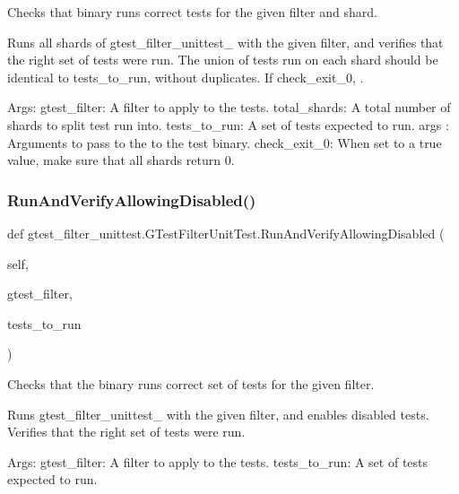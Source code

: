 \begin{DoxyVerb}Checks that binary runs correct tests for the given filter and shard.

Runs all shards of gtest_filter_unittest_ with the given filter, and
verifies that the right set of tests were run. The union of tests run
on each shard should be identical to tests_to_run, without duplicates.
If check_exit_0, .

Args:
  gtest_filter: A filter to apply to the tests.
  total_shards: A total number of shards to split test run into.
  tests_to_run: A set of tests expected to run.
  args   :      Arguments to pass to the to the test binary.
  check_exit_0: When set to a true value, make sure that all shards
            return 0.
\end{DoxyVerb}
 \mbox{\label{classgtest__filter__unittest_1_1GTestFilterUnitTest_ae52bd70ef1dcb68c83c0379ddfb987a9}} 
\subsubsection{\texorpdfstring{Run\+And\+Verify\+Allowing\+Disabled()}{RunAndVerifyAllowingDisabled()}}
{\footnotesize\ttfamily def gtest\+\_\+filter\+\_\+unittest.\+G\+Test\+Filter\+Unit\+Test.\+Run\+And\+Verify\+Allowing\+Disabled (\begin{DoxyParamCaption}\item[{}]{self,  }\item[{}]{gtest\+\_\+filter,  }\item[{}]{tests\+\_\+to\+\_\+run }\end{DoxyParamCaption})}

\begin{DoxyVerb}Checks that the binary runs correct set of tests for the given filter.

Runs gtest_filter_unittest_ with the given filter, and enables
disabled tests. Verifies that the right set of tests were run.

Args:
  gtest_filter: A filter to apply to the tests.
  tests_to_run: A set of tests expected to run.
\end{DoxyVerb}
 \mbox{\label{classgtest__filter__unittest_1_1GTestFilterUnitTest_af20a71b1659314a5cc1093d77a673495}} 
